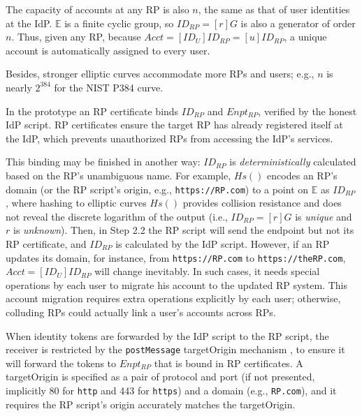 The capacity of accounts at any RP is also $n$,
    the same as that of user identities at the IdP.
$\mathbb{E}$ is a finite cyclic group,
    so $ID_{RP} = [r]G$ is also a generator of order $n$.
Thus, given any RP,
because $Acct =  [ID_U]ID_{RP} = [u]ID_{RP}$,
    a unique account is automatically assigned to every user.

Besides, stronger elliptic curves accommodate more RPs and users;
e.g., $n$ is nearly $2^{384}$ for the NIST P384 curve.


\vspace{1mm}
In the prototype an RP certificate binds $ID_{RP}$ and $Enpt_{RP}$,
    verified by the honest IdP script.
RP certificates ensure the target RP has already registered itself at the IdP,
 which prevents unauthorized RPs from accessing the IdP's services.

This binding may be finished in another way:
    $ID_{RP}$ is \emph{deterministically} calculated based on the RP's unambiguous name.
For example, $Hs()$ encodes an RP's domain (or the RP script's origin, e.g., \verb+https://RP.com+) to
 a point on $\mathbb{E}$ as $ID_{RP}$,
where
    hashing to elliptic curves $Hs()$ \cite{irtf-cfrg-hash-to-curve-16} provides collision resistance
     and does not reveal the discrete logarithm of the output
    (i.e., $ID_{RP} = [r]G$ is \emph{unique} and $r$ is \emph{unknown}).
Then,  in Step 2.2 the RP script will send the endpoint but not its RP certificate,
 and $ID_{RP}$ is calculated by the IdP script.
However, if an RP updates its domain, for instance, from \verb+https://RP.com+ to \verb+https://theRP.com+,
$Acct = [ID_U]ID_{RP}$ will change inevitably.
In such cases,
    it needs special operations by each user to migrate his account
            to the updated RP system.
This account migration requires extra operations explicitly by each user;
    otherwise,
        colluding RPs could actually link a user's accounts across RPs.

\vspace{1mm}

\vspace{1mm}
When identity tokens are forwarded by the IdP script to the RP script, %
    the receiver is restricted by the \verb+postMessage+ targetOrigin mechanism \cite{postm-targeto},
        to ensure it will forward the tokens to $Enpt_{RP}$
        that is bound in RP certificates.
A targetOrigin is specified as
a pair of protocol and port (if not presented, implicitly 80 for \verb+http+ and 443 for \verb+https+)
    and a domain (e.g., \verb+RP.com+),
        and it requires the RP script's origin accurately matches the targetOrigin.

